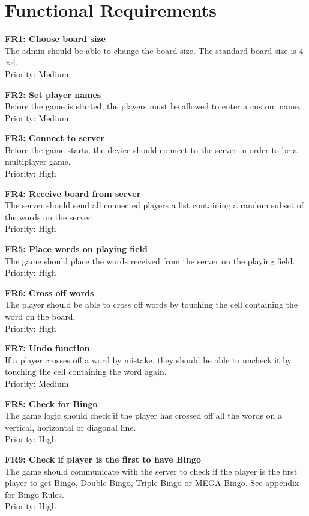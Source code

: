 \section{Functional Requirements} 
\label{sec:functional requirements}

{\bf FR1: Choose board size}\\
The admin should be able to change the board size. The standard board size is
4$\times$4.\\
Priority: Medium

{\bf FR2: Set player names}\\
Before the game is started, the players must be allowed to enter a custom
name.\\
Priority: Medium

{\bf FR3: Connect to server}\\
Before the game starts, the device should connect to the server in order to be
a multiplayer game.\\
Priority: High

{\bf FR4: Receive board from server}\\
The server should send all connected players a list containing a random
subset of the words on the server.\\
Priority: High

{\bf FR5: Place words on playing field}\\
The game should place the words received from the server on the playing
field.\\
Priority: High

{\bf FR6: Cross off words}\\
The player should be able to cross off words by touching the cell containing
the word on the board.\\
Priority: High

{\bf FR7: Undo function}\\
If a player crosses off a word by mistake, they should be able to uncheck it by
touching the cell containing the word again.\\
Priority: Medium

{\bf FR8: Check for Bingo}\\
The game logic should check if the player has crossed off all the words on a
vertical, horizontal or diagonal line.\\
Priority: High

{\bf FR9: Check if player is the first to have Bingo}\\
The game should communicate with the server to check if the player is the first
player to get Bingo, Double-Bingo, Triple-Bingo or MEGA-Bingo. See appendix for
Bingo Rules.\\
Priority: High

